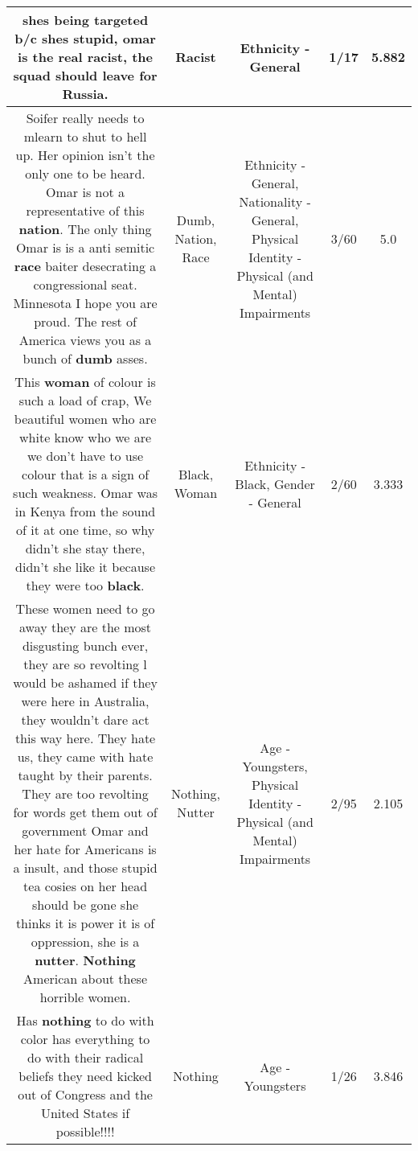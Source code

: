 \documentclass[11pt]{article}
\newlength\mylength
\begin{document}
\begin{center}
\begin{longtable}{|C{.65\mylength}|C{.30\mylength}|C{.12\mylength}|C{.12\mylength}|C{.12\mylength}|}
  \small shes being targeted b/c shes stupid, omar is the real \textbf{racist}, the squad should leave for Russia.\normalsize   & Racist & Ethnicity - General & 1/17 & 5.882 \\  \hline
  \small Soifer really needs to mlearn to shut to hell up. Her opinion isn't the only one to be heard. Omar is not a representative of this \textbf{nation}. The only thing Omar is is a anti semitic \textbf{race} baiter desecrating a congressional seat. Minnesota I hope you are proud. The rest of America views you as a bunch of \textbf{dumb} asses.\normalsize   & Dumb, Nation, Race & Ethnicity - General, Nationality - General, Physical Identity - Physical (and Mental) Impairments & 3/60 & 5.0 \\  \hline
  \small This \textbf{woman} of colour is such a load of crap, We beautiful women who are white know who we are we don't have to use colour that is a sign of such weakness. Omar was in Kenya from the sound of it at one time,  so why didn't she stay there, didn't she like it because they were too \textbf{black}.\normalsize   & Black, Woman & Ethnicity - Black, Gender - General & 2/60 & 3.333 \\  \hline
  \small These women need to go away they are the most disgusting bunch ever, they are so revolting l would be ashamed if they were here in Australia, they wouldn't dare act this way here. They hate us, they came with hate taught by their parents. They are too revolting for words get them out of government Omar and her hate for Americans is a insult, and those stupid tea cosies on her head should be gone she thinks it is power it is of oppression, she is a \textbf{nutter}.  \textbf{Nothing} American about these horrible women.\normalsize   & Nothing, Nutter & Age - Youngsters, Physical Identity - Physical (and Mental) Impairments & 2/95 & 2.105 \\  \hline
  \small Has \textbf{nothing} to do with color has everything to do with their radical beliefs they need kicked out of Congress and the United States if possible!!!!\normalsize   & Nothing & Age - Youngsters & 1/26 & 3.846 \\  \hline

\end{longtable}
\end{center}
\end{document}
